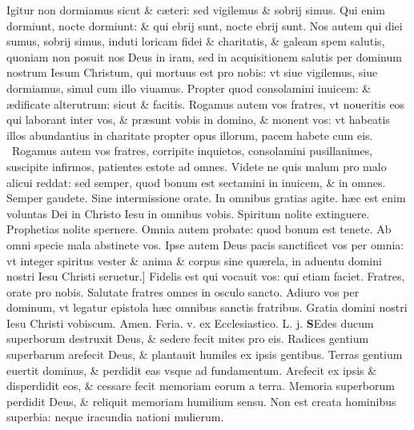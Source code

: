 \documentclass[a5paper,10pt]{book}
\def\leftmarginnote{%
	\lrmarginnote{\hskip -\marginparsep \hskip -6.5em}}
\def\rightmarginnote{%
	\lrmarginnote{\hskip\columnwidth \hskip -1em}}
\def\ae{æ}
\begin{document}
\begin{multicols*}{2}
Igitur non dormiamus sicut \& c\ae teri: sed vigilemus \& sobrij simus. Qui enim dormiunt, nocte dormiunt: \& qui ebrij sunt, nocte ebrij sunt.
Nos autem qui diei sumus, sobrij simus, induti loricam fidei \& charitatis, \& galeam spem salutis, quoniam non posuit nos Deus in iram, sed in acquisitionem salutis per dominum nostrum Iesum Christum, qui mortuus est pro nobis: vt siue vigilemus, siue dormiamus, simul cum illo viuamus.
Propter quod consolamini inuicem: \& \ae dificate alterutrum: sicut \& facitis. Rogamus autem vos fratres, vt noueritis eos qui laborant inter vos, \& pr\ae sunt vobis in domino, \& monent vos: vt habeatis illos abundantius in charitate propter opus illorum, pacem habete cum eis. \textdagger \ 
Rogamus\leftmarginnote{\begin{flushright}B\end{flushright}} autem vos fratres, corripite inquietos, consolamini pusillanimes, suscipite infirmos, patientes estote ad omnes.
Videte ne quis malum pro malo alicui reddat: sed semper, quod bonum est sectamini in inuicem, \& in omnes.
Semper gaudete. Sine intermissione orate. In omnibus gratias agite. h\ae c est enim voluntas Dei in Christo
Iesu in omnibus vobis.
Spiritum nolite extinguere. Prophetias nolite spernere. Omnia autem probate: quod bonum est tenete. Ab omni specie mala abstinete vos.
Ipse autem Deus pacis sanctificet vos per omnia: vt integer spiritus vester \& anima \& corpus sine qu\ae rela, in aduentu domini nostri Iesu Christi seruetur.]
Fidelis\leftmarginnote{\begin{flushright}C\end{flushright}} est qui vocauit vos: qui etiam faciet. Fratres, orate pro nobis.
Salutate fratres omnes in osculo sancto. Adiuro vos per dominum, vt legatur epistola h\ae c omnibus sanctis fratribus.
Gratia domini nostri Iesu Christi vobiscum. Amen.
\newline {} \color{red} \hypertarget{THU-TERTIA-VAGAN}{Feria. v.} ex Ecclesiastico. \quad L. j. \color{black}
\bookmark[dest=THU-TERTIA-VAGAN]{FERIA QVINTA}
\vspace{-1.25em}
\lettrine[lines=2]{\bfseries S}{}Edes\rightmarginnote{c. 10.} ducum superborum destruxit Deus, \& sedere fecit mites pro eis.
Radices gentium superbarum arefecit Deus, \& plantauit humiles ex ipsis gentibus. Terras gentium euertit dominus, \& perdidit eas vsque ad fundamentum. Arefecit ex ipsis \& disperdidit eos, \& cessare fecit memoriam eorum a terra.
Memoria superborum perdidit Deus, \& reliquit memoriam humilium sensu. Non est creata hominibus superbia: neque iracundia nationi mulierum.

\end{multicols*}
\end{document}
